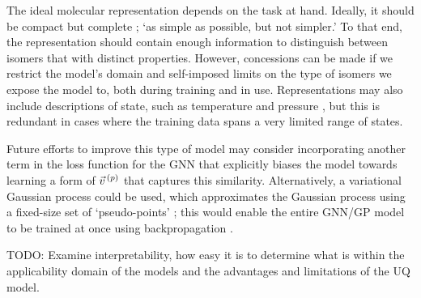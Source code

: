 The ideal molecular
representation depends on the task at hand. Ideally, it should be compact but
complete
\cite{faberCrystalStructureRepresentations2015,himanenDScribeLibraryDescriptors2020};
`as simple as possible, but not simpler.' To that end, the representation should
contain enough information to distinguish between isomers that with distinct
properties. However, concessions can be made if we restrict the model's domain
and self-imposed limits on the type of isomers we expose the model to, both
during training and in use. Representations may also include descriptions of
state, such as temperature and pressure \cite{chenGraphNetworksUniversal2019},
but this is redundant in cases where the training data spans a very limited
range of states.

Future efforts to improve this type of model may consider incorporating another
term in the loss function for the GNN that explicitly biases the model towards
learning a form of $\vec{v}^{\,(p)}{}$ that captures this similarity. Alternatively, a
variational Gaussian process could be used, which approximates the Gaussian
process using a fixed-size set of `pseudo-points'
\cite{hensmanGaussianProcessesBig2013a}; this would enable the entire GNN/GP
model to be trained at once using backpropagation
\cite{moriartyUnlockNNUncertaintyQuantification2022}.

TODO: Examine interpretability, how easy it is to determine what is within the
applicability domain of the models and the advantages and limitations of the UQ
model.